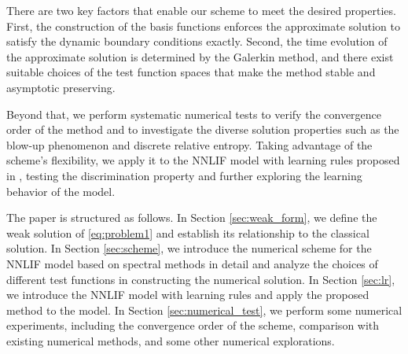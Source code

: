 There are two key factors that enable our scheme to meet the desired properties. First, the construction of the basis functions enforces the approximate solution to satisfy the dynamic boundary conditions exactly. Second, the time evolution of the approximate solution is determined by the Galerkin method, and there exist suitable choices of the test function spaces  that make the method stable and asymptotic preserving.


Beyond that, we perform systematic numerical tests to verify the convergence order of the method and to investigate the diverse solution properties such as the blow-up phenomenon and discrete relative entropy. Taking advantage of the scheme's flexibility, we apply it to the NNLIF model with learning rules proposed in \cite{perthame2017distributed}, testing the discrimination property and further exploring the learning behavior of the model.


The paper is structured as follows. In Section \ref{sec:weak_form}, we define the weak solution of \eqref{eq:problem1} and establish its relationship to the classical solution. In Section \ref{sec:scheme}, we introduce the numerical scheme for the NNLIF model based on spectral methods in detail and analyze the choices of different test functions in constructing the numerical solution. In Section \ref{sec:lr}, we introduce the NNLIF model with learning rules and apply the proposed method to the model. In Section \ref{sec:numerical_test}, we perform some numerical experiments, including the convergence order of the scheme, comparison with existing numerical methods, and some other numerical explorations.